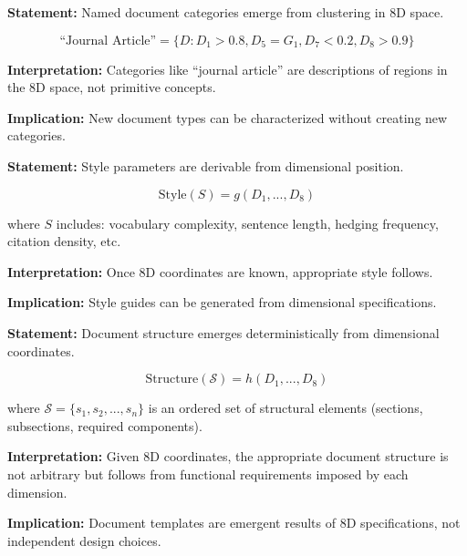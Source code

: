 \begin{tcolorbox}[colback=gray!5!white, colframe=gray!75!black,
    title=Axiom DT-3: Category Emergence]
\textbf{Statement:} Named document categories emerge from clustering in 8D space.

\begin{equation}
\text{``Journal Article''} = \{D : D_1 > 0.8, D_5 = G_1, D_7 < 0.2, D_8 > 0.9\}
\end{equation}

\textbf{Interpretation:} Categories like ``journal article'' are descriptions
of regions in the 8D space, not primitive concepts.

\textbf{Implication:} New document types can be characterized without
creating new categories.
\end{tcolorbox}

\begin{tcolorbox}[colback=gray!5!white, colframe=gray!75!black,
    title=Axiom DT-4: Style Derivation]
\textbf{Statement:} Style parameters are derivable from dimensional position.

\begin{equation}
\text{Style}(S) = g(D_1, ..., D_8)
\end{equation}

where $S$ includes: vocabulary complexity, sentence length, hedging frequency,
citation density, etc.

\textbf{Interpretation:} Once 8D coordinates are known, appropriate style follows.

\textbf{Implication:} Style guides can be generated from dimensional specifications.
\end{tcolorbox}

\begin{tcolorbox}[colback=gray!5!white, colframe=gray!75!black,
    title=Axiom DT-5: Structure Emergence]
\textbf{Statement:} Document structure emerges deterministically from dimensional coordinates.

\begin{equation}
\text{Structure}(\mathcal{S}) = h(D_1, ..., D_8)
\end{equation}

where $\mathcal{S} = \{s_1, s_2, ..., s_n\}$ is an ordered set of structural elements
(sections, subsections, required components).

\textbf{Interpretation:} Given 8D coordinates, the appropriate document structure
is not arbitrary but follows from functional requirements imposed by each dimension.

\textbf{Implication:} Document templates are emergent results of 8D specifications,
not independent design choices.
\end{tcolorbox}

